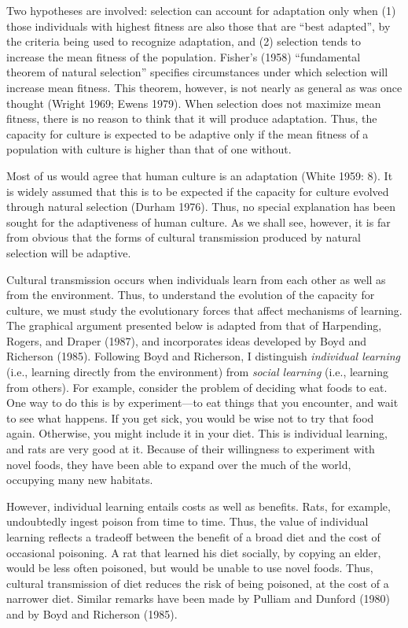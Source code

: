 \documentclass[11pt]{article}
\begin{document}
Two hypotheses are involved: selection can account for adaptation only
when (1) those individuals with 
highest fitness are also those that are ``best adapted'', by the criteria
being used to recognize adaptation, and (2) selection tends to increase the
mean fitness of the population.  Fisher's (1958) ``fundamental theorem of
natural selection'' specifies circumstances under which selection will
increase mean fitness.  This theorem, however, is not nearly as general as
was once thought (Wright 1969; Ewens 1979).  When selection does not
maximize mean fitness, there is no reason to think that it will produce
adaptation.  Thus, the capacity for culture is expected to be adaptive
only if the mean fitness of a population with culture is higher than that
of one without.

Most of us would agree that human culture is an adaptation (White 1959:
8). It is widely assumed that this is to be expected if the capacity for
culture evolved through natural selection (Durham 1976).  Thus, no special
explanation has been sought for the adaptiveness of human culture.  As we
shall see, however, it is far from obvious that the forms of cultural
transmission produced by natural selection will be adaptive.

Cultural transmission occurs when individuals learn from each other as
well as from the environment.  Thus, to understand the evolution of the
capacity for culture, we must study the evolutionary forces that affect
mechanisms of learning.  The graphical argument presented below is adapted
from that of Harpending, Rogers, and Draper (1987), and incorporates ideas
developed by Boyd and Richerson (1985).  Following Boyd and Richerson, I
distinguish \emph{individual learning} (i.e., learning directly from the
environment) from \emph{social learning} (i.e., learning from others). For
example, consider the problem of deciding what foods to eat.  One
way to do this is by experiment---to eat things that you encounter, and
wait to see what happens.  If you get sick, you would be wise not to try
that food again.  Otherwise, you might include it in your diet.  This is
individual learning, and rats are very good at it.  Because of their
willingness to experiment with novel foods, they have been able to expand
over the much of the world, occupying many new habitats.  

However, individual learning entails costs as well as benefits.  Rats, for
example, undoubtedly ingest poison from time to time.  Thus, the value of
individual learning reflects a tradeoff between the benefit of a broad
diet and the cost of occasional poisoning.  A rat that learned his diet
socially, by copying an elder, would be less often poisoned, but would be
unable to use novel foods.  Thus, cultural transmission of diet reduces
the risk of being poisoned, at the cost of a narrower diet.  Similar
remarks have been made by Pulliam and Dunford (1980) and by Boyd and
Richerson (1985).
\end{document}
